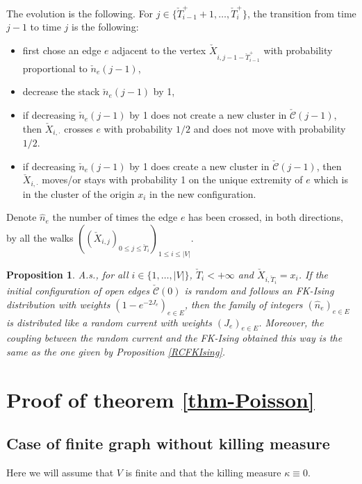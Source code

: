 \documentclass[11pt,a4paper]{amsart}
\numberwithin{equation}{section}
\newtheorem{proposition}{Proposition}[section]
\begin{document}
The evolution is the following. For 
$j\in \lbrace \check{T}_{i-1}^{+}+1,\dots, \check{T}_{i}^{+}\rbrace$, the transition from time $j-1$ to time $j$ is the following:
\begin{itemize}
\item first chose an edge $e$ adjacent to the vertex
$\check{X}_{i,j-1-\check{T}_{i-1}^{+}}$ with probability proportional to
$\check{n}_{e}(j-1)$,
\item decrease the stack $\check{n}_{e}(j-1)$ by 1,
\item if decreasing $\check{n}_{e}(j-1)$ by 1 does not create a new cluster in  $\check{\mathcal{C}}(j-1)$, then 
$\check{X}_{i,\cdot}$ crosses $e$ with probability $1/2$ and
does not move with probability $1/2$.
\item if decreasing $\check{n}_{e}(j-1)$ by 1 does create a new cluster in  $\check{\mathcal{C}}(j-1)$, then $\check{X}_{i,\cdot}$
moves/or stays with probability 1 on the unique extremity of $e$ which is in the cluster of the origin $x_{i}$ in the new configuration.
\end{itemize}

Denote $\hat{n}_{e}$ the number of times the edge $e$ has been crossed, in both directions, by all the walks
$((\check{X}_{i,j})_{0\le j\le \check{T}_{i}})_{1\le i\le\vert V\vert}$.

\begin{proposition}
A.s., for all $i\in\lbrace 1,\dots,\vert V\vert\rbrace$,
$\check{T}_{i}<+\infty$ and $\check{X}_{i,\check{T}_{i}}=x_{i}$. If the initial configuration of open edges
$\check{\mathcal{C}}(0)$ is random and follows an FK-Ising distribution
with weights $(1-e^{-2 J_{e}})_{e\in E}$, then the family of integers
$(\hat{n}_{e})_{e\in E}$ is distributed like a random current with weights
$(J_{e})_{e\in E}$. Moreover, the coupling between the random current and the FK-Ising obtained this way is the same as the one given by
Proposition \ref{RCFKIsing}.
\end{proposition}


\section{Proof of theorem \ref{thm-Poisson} }
\label{sec:proof}
\subsection{Case of finite graph without killing measure}
\label{sec:pfinite}
Here we will assume that $V$ is finite and that the killing measure
$\kappa\equiv 0$.
\end{document}
